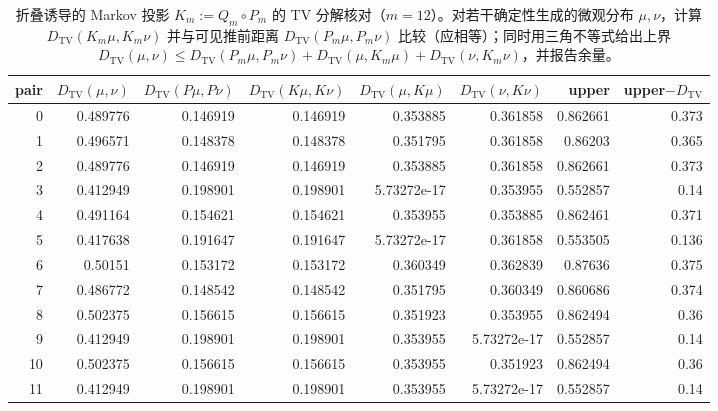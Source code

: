 \begin{table}[H]
\centering
\scriptsize
\setlength{\tabcolsep}{3pt}
\caption{折叠诱导的 Markov 投影 $K_m:=Q_m\circ P_m$ 的 TV 分解核对（$m=12$）。对若干确定性生成的微观分布 $\mu,\nu$，计算 $D_{\mathrm{TV}}(K_m\mu,K_m\nu)$ 并与可见推前距离 $D_{\mathrm{TV}}(P_m\mu,P_m\nu)$ 比较（应相等）；同时用三角不等式给出上界 $D_{\mathrm{TV}}(\mu,\nu)\le D_{\mathrm{TV}}(P_m\mu,P_m\nu)+D_{\mathrm{TV}}(\mu,K_m\mu)+D_{\mathrm{TV}}(\nu,K_m\nu)$，并报告余量。}
\label{tab:fold_markov_projection_tv_decomposition}
\begin{tabular}{rrrrrrrr}
\toprule
pair & $D_{\mathrm{TV}}(\mu,\nu)$ & $D_{\mathrm{TV}}(P\mu,P\nu)$ & $D_{\mathrm{TV}}(K\mu,K\nu)$ & $D_{\mathrm{TV}}(\mu,K\mu)$ & $D_{\mathrm{TV}}(\nu,K\nu)$ & upper & upper$-D_{\mathrm{TV}}$\\
\midrule
0 & 0.489776 & 0.146919 & 0.146919 & 0.353885 & 0.361858 & 0.862661 & 0.373\\
1 & 0.496571 & 0.148378 & 0.148378 & 0.351795 & 0.361858 & 0.86203 & 0.365\\
2 & 0.489776 & 0.146919 & 0.146919 & 0.353885 & 0.361858 & 0.862661 & 0.373\\
3 & 0.412949 & 0.198901 & 0.198901 & 5.73272e-17 & 0.353955 & 0.552857 & 0.14\\
4 & 0.491164 & 0.154621 & 0.154621 & 0.353955 & 0.353885 & 0.862461 & 0.371\\
5 & 0.417638 & 0.191647 & 0.191647 & 5.73272e-17 & 0.361858 & 0.553505 & 0.136\\
6 & 0.50151 & 0.153172 & 0.153172 & 0.360349 & 0.362839 & 0.87636 & 0.375\\
7 & 0.486772 & 0.148542 & 0.148542 & 0.351795 & 0.360349 & 0.860686 & 0.374\\
8 & 0.502375 & 0.156615 & 0.156615 & 0.351923 & 0.353955 & 0.862494 & 0.36\\
9 & 0.412949 & 0.198901 & 0.198901 & 0.353955 & 5.73272e-17 & 0.552857 & 0.14\\
10 & 0.502375 & 0.156615 & 0.156615 & 0.353955 & 0.351923 & 0.862494 & 0.36\\
11 & 0.412949 & 0.198901 & 0.198901 & 0.353955 & 5.73272e-17 & 0.552857 & 0.14\\
\bottomrule
\end{tabular}
\end{table}
